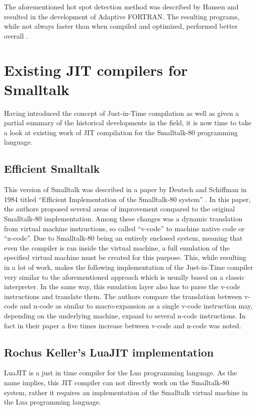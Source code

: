 The aforementioned hot spot detection method was described by Hansen and resulted in the development of Adaptive FORTRAN. 
The resulting programs, while not always faster than when compiled and optimized, performed better overall \cite{Hansen1974}.

\section{Existing JIT compilers for Smalltalk}
Having introduced the concept of Just-in-Time compilation as well as given a partial summary of the historical developments in the field, it is now time to take a look at existing work of JIT compilation for the Smalltalk-80 programming language. 

\subsection{Efficient Smalltalk}
This version of Smalltalk was described in a paper by Deutsch and Schiffman in 1984 titled \enquote{Efficient Implementation of the Smalltalk-80 system} \cite{Deutsch1984}.
In this paper, the authors proposed several areas of improvement compared to the original Smalltalk-80 implementation. 
Among these changes was a dynamic translation from virtual machine instructions, so called \enquote{v-code} to machine native code or \enquote{n-code}. 
Due to Smalltalk-80 being an entirely enclosed system, meaning that even the compiler is ran inside the virtual machine, a full emulation of the specified virtual machine must be created for this purpose. 
This, while resulting in a lot of work, makes the following implementation of the Just-in-Time compiler very similar to the aforementioned approach which is usually based on a classic interpreter. In the same way, this emulation layer also has to parse the v-code instructions and translate them. 
The authors compare the translation between v-code and n-code as similar to macro-expansion as a single v-code instruction may, depending on the underlying machine, expand to several n-code instructions. In fact in their paper a five times increase between v-code and n-code was noted.

\subsection{Rochus Keller's LuaJIT implementation}
LuaJIT is a just in time compiler for the Lua programming language. As the name implies, this JIT compiler can not directly work on the Smalltalk-80 system, rather it requires an implementation of the Smalltalk virtual machine in the Lua programming language.


